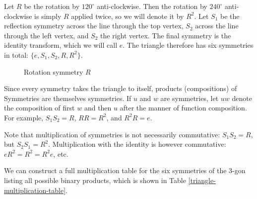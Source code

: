 \documentclass[12pt]{article}
\begin{document}
Let $R$ be the rotation by $120^\circ$ anti-clockwise. Then the rotation by $240^\circ$ anti-clockwise is simply $R$ applied twice, so we will denote it by $R^2$. Let $S_1$ be the reflection symmetry across the line through the top vertex, $S_2$ across the line through the left vertex, and $S_2$ the right vertex. The final symmetry is the identity transform, which we will call $e$. The triangle therefore has six symmetries in total: $\{e, S_1, S_2, R, R^2\}$.

\begin{figure}[ht!]
    \centering
\caption{Rotation symmetry $R$}
\label{fig:triangle-rotation}
\end{figure}

Since every symmetry takes the triangle to itself, products (compositions) of Symmetries are themselves symmetries. If $u$ and $w$ are symmetries, let $uw$ denote the composition of first $w$ and then $u$ after the manner of function composition. For example, $S_1S_2 = R$, $RR = R^2$, and $R^2R = e$.

Note that multiplication of symmetries is not necessarily commutative: $S_1S_2 = R$, but $S_2S_1 = R^2$. Multiplication with the identity is however commutative: $eR^2 = R^2 = R^2e$, etc.

We can construct a full multiplication table for the six symmetries of the $3$-gon listing all possible binary products, which is shown in Table \ref{triangle-multiplication-table}.
\end{document}
